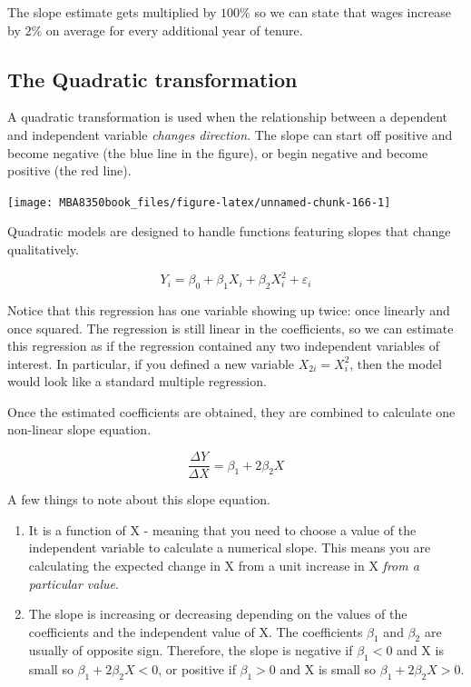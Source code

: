 \documentclass[
]{book}
\begin{document}
The slope estimate gets multiplied by \(100\%\) so we can state that wages increase by \(2\%\) on average for every additional year of tenure.

\hypertarget{the-quadratic-transformation}{%
\subsection{The Quadratic transformation}\label{the-quadratic-transformation}}

A quadratic transformation is used when the relationship between a dependent and independent variable \emph{changes direction}. The slope can start off positive and become negative (the blue line in the figure), or begin negative and become positive (the red line).

\begin{center}\texttt{[image: MBA8350book\_files/figure-latex/unnamed-chunk-166-1]} \end{center}

Quadratic models are designed to handle functions featuring slopes that change qualitatively.

\[Y_i = \beta_0 + \beta_1 X_i + \beta_2 X_i^2 + \varepsilon_i\]

Notice that this regression has one variable showing up twice: once linearly and once squared. The regression is still linear in the coefficients, so we can estimate this regression as if the regression contained any two independent variables of interest. In particular, if you defined a new variable \(X_{2i} = X_i^2\), then the model would look like a standard multiple regression.

Once the estimated coefficients are obtained, they are combined to calculate one non-linear slope equation.

\[\frac{\Delta Y}{\Delta X} = \beta_1 + 2\beta_2  X\]

A few things to note about this slope equation.

\begin{enumerate}
\def\labelenumi{\arabic{enumi}.}
\item
  It is a function of X - meaning that you need to choose a value of the independent variable to calculate a numerical slope. This means you are calculating the expected change in X from a unit increase in X \emph{from a particular value}.
\item
  The slope is increasing or decreasing depending on the values of the coefficients and the independent value of X. The coefficients \(\beta_1\) and \(\beta_2\) are usually of opposite sign. Therefore, the slope is negative if \(\beta_1<0\) and X is small so \(\beta_1 + 2\beta_2 X<0\), or positive if \(\beta_1>0\) and X is small so \(\beta_1 + 2\beta_2 X>0\).
\end{enumerate}
\end{document}
